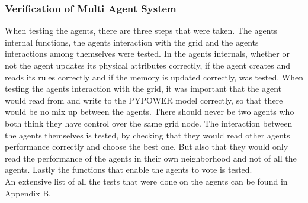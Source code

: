 \documentclass[a4paper]{article}
\begin{document}
\subsubsection{Verification of Multi Agent System}
When testing the agents, there are three steps that were taken. The agents internal functions, the agents interaction with the grid and the 
agents interactions among themselves were tested. In the agents internals, whether or not the agent updates its physical attributes 
correctly, if the agent creates and reads its rules correctly and if the memory is updated correctly, was tested. When testing the agents
interaction with the grid, it was important that the agent would read from and write to the PYPOWER model correctly, so that there would be 
no mix up between the agents. There should never be two agents who both think they have control over the same grid node. The interaction 
between the agents themselves is tested, by checking that they would read other agents performance correctly and choose the best one. But 
also that they would only read the performance of the agents in their own neighborhood and not of all the agents. Lastly the functions 
that enable the agents to vote is tested.\\
An extensive list of all the tests that were done on the agents can be found in Appendix B. 
\end{document}

